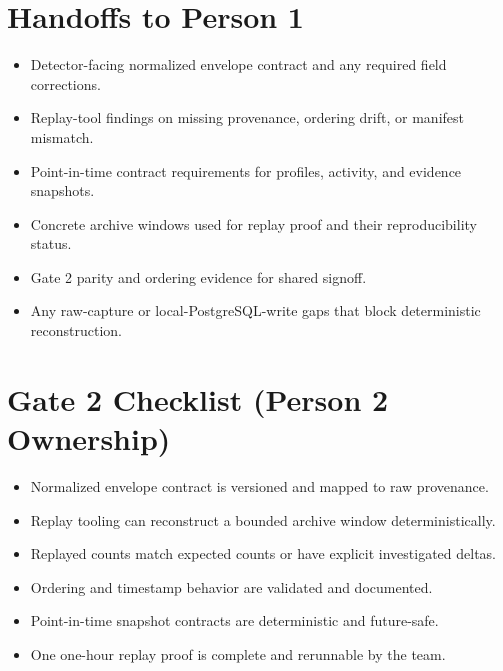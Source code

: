 \documentclass{article}
\begin{document}
\section*{Handoffs to Person 1}
\begin{itemize}
\item Detector-facing normalized envelope contract and any required field corrections.
\item Replay-tool findings on missing provenance, ordering drift, or manifest mismatch.
\item Point-in-time contract requirements for profiles, activity, and evidence snapshots.
\item Concrete archive windows used for replay proof and their reproducibility status.
\item Gate 2 parity and ordering evidence for shared signoff.
\item Any raw-capture or local-PostgreSQL-write gaps that block deterministic reconstruction.
\end{itemize}

\section*{Gate 2 Checklist (Person 2 Ownership)}
\begin{itemize}
\item Normalized envelope contract is versioned and mapped to raw provenance.
\item Replay tooling can reconstruct a bounded archive window deterministically.
\item Replayed counts match expected counts or have explicit investigated deltas.
\item Ordering and timestamp behavior are validated and documented.
\item Point-in-time snapshot contracts are deterministic and future-safe.
\item One one-hour replay proof is complete and rerunnable by the team.
\end{itemize}
\end{document}
